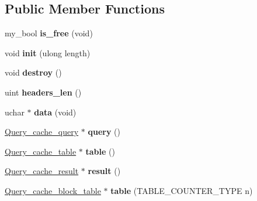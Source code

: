 \subsection*{Public Member Functions}
\begin{DoxyCompactItemize}
\item 
\mbox{\label{structQuery__cache__block_a6bfbe1e6df2080c9d7c8e8318ee33084}} 
my\+\_\+bool {\bfseries is\+\_\+free} (void)
\item 
\mbox{\label{structQuery__cache__block_a34fdab0d234a7348533dafbcce84e123}} 
void {\bfseries init} (ulong length)
\item 
\mbox{\label{structQuery__cache__block_a4b6263bc4fef3c97cca3961822f89ce5}} 
void {\bfseries destroy} ()
\item 
\mbox{\label{structQuery__cache__block_ac6a4660d5daf10245f0c9f8da9187841}} 
uint {\bfseries headers\+\_\+len} ()
\item 
\mbox{\label{structQuery__cache__block_aa108d13c81816283fff7832db166a7cd}} 
uchar $\ast$ {\bfseries data} (void)
\item 
\mbox{\label{structQuery__cache__block_ac28e8e8fd55e35804e65e744f7055814}} 
\mbox{\hyperlink{structQuery__cache__query}{Query\+\_\+cache\+\_\+query}} $\ast$ {\bfseries query} ()
\item 
\mbox{\label{structQuery__cache__block_a4f27f805126d29a2f5e264fbb0f81b07}} 
\mbox{\hyperlink{structQuery__cache__table}{Query\+\_\+cache\+\_\+table}} $\ast$ {\bfseries table} ()
\item 
\mbox{\label{structQuery__cache__block_adf1e66c5f4900f0f8605bfbdacc246d6}} 
\mbox{\hyperlink{structQuery__cache__result}{Query\+\_\+cache\+\_\+result}} $\ast$ {\bfseries result} ()
\item 
\mbox{\label{structQuery__cache__block_af837436380d58df2d9b6806b953194c8}} 
\mbox{\hyperlink{structQuery__cache__block__table}{Query\+\_\+cache\+\_\+block\+\_\+table}} $\ast$ {\bfseries table} (T\+A\+B\+L\+E\+\_\+\+C\+O\+U\+N\+T\+E\+R\+\_\+\+T\+Y\+PE n)
\end{DoxyCompactItemize}
